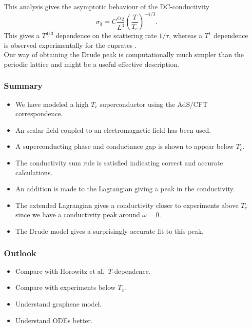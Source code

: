 \documentclass{beamer}
\begin{document}
\begin{frame}
This analysis gives the asymptotic behaviour of the DC-conductivity
\begin{equation}
 \sigma_0=C\frac{\alpha_2}{L^4}\left(\frac{T}{T_c}\right)^{-4/3}.
\end{equation}
This gives a $T^{4/3}$ dependence on the scattering rate $1/\tau$, whereas a $T^1$ dependence is observed experimentally for the cuprates \cite{drudeFit}.\\

Our way of obtaining the Drude peak is computationally much simpler than the periodic lattice and might be a useful effective description.\\
\end{frame}

\begin{frame}
\frametitle{Summary}
\begin{itemize}
\item We have modeled a high $T_c$ superconductor using the AdS/CFT correspondence.
\item An scalar field coupled to an electromagnetic field has been used.
\item A superconducting phase and conductance gap is shown to appear below $T_c$.
\item The conductivity sum rule is satisfied indicating correct and accurate calculations.
\item An addition is made to the Lagrangian giving a peak in the conductivity.
\item The extended Lagrangian gives a conductivity closer to experiments above $T_c$ since we have a conductivity peak around $\omega=0$.
\item The Drude model gives a surprisingly accurate fit to this peak.
\end{itemize}
\end{frame}

\begin{frame}
\frametitle{Outlook}
\begin{itemize}
\item Compare with Horowitz et al.~$T$-dependence.
\item Compare with experiments below $T_c$.
\item Understand graphene model.
\item Understand ODEs better.
\end{itemize}
\end{frame}

\begin{frame}


\end{frame}
\end{document}
